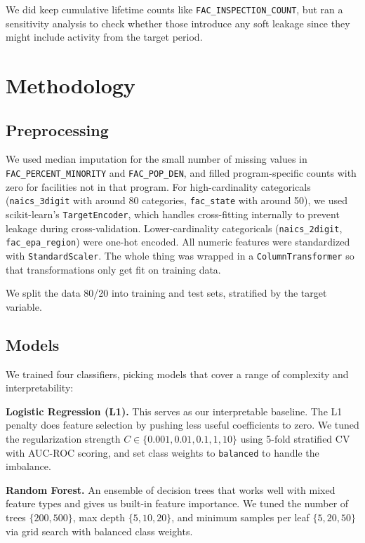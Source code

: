 \documentclass[11pt]{article}
\begin{document}
We did keep cumulative lifetime counts like \texttt{FAC\_INSPECTION\_COUNT}, but ran a sensitivity analysis to check whether those introduce any soft leakage since they might include activity from the target period.


\section{Methodology}

\subsection{Preprocessing}

We used median imputation for the small number of missing values in \texttt{FAC\_PERCENT\_MINORITY} and \texttt{FAC\_POP\_DEN}, and filled program-specific counts with zero for facilities not in that program. For high-cardinality categoricals (\texttt{naics\_3digit} with around 80 categories, \texttt{fac\_state} with around 50), we used scikit-learn's \texttt{TargetEncoder}, which handles cross-fitting internally to prevent leakage during cross-validation. Lower-cardinality categoricals (\texttt{naics\_2digit}, \texttt{fac\_epa\_region}) were one-hot encoded. All numeric features were standardized with \texttt{StandardScaler}. The whole thing was wrapped in a \texttt{ColumnTransformer} so that transformations only get fit on training data.

We split the data 80/20 into training and test sets, stratified by the target variable.

\subsection{Models}

We trained four classifiers, picking models that cover a range of complexity and interpretability:

\textbf{Logistic Regression (L1).} This serves as our interpretable baseline. The L1 penalty does feature selection by pushing less useful coefficients to zero. We tuned the regularization strength $C \in \{0.001, 0.01, 0.1, 1, 10\}$ using 5-fold stratified CV with AUC-ROC scoring, and set class weights to \texttt{balanced} to handle the imbalance.

\textbf{Random Forest.} An ensemble of decision trees that works well with mixed feature types and gives us built-in feature importance. We tuned the number of trees $\{200, 500\}$, max depth $\{5, 10, 20\}$, and minimum samples per leaf $\{5, 20, 50\}$ via grid search with balanced class weights.
\end{document}

